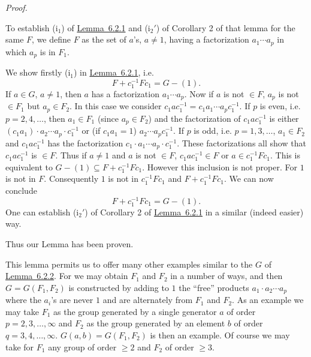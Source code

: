 \documentclass[b5paper,twoside]{article}
\newcommand{\lemref}[2]{\hyperref[#1]{\mbox{Lemma~#2}}}
\theoremstyle{mvnplain}
\renewenvironment{proof}[1][Proof]{%
  \par\addvspace{0.35\baselineskip}%
  \noindent\textit{#1.}\ \normalfont\ignorespaces
}{%
  \par\addvspace{0.35\baselineskip}%
}
\def\mathfrak#1{#1}%
\begin{document}
\begin{proof}
To establish (i$_1$) of \lemref{lem:6.2.1}{6.2.1} and (i$_2'$) of Corollary
2 of that lemma for the same $\mathfrak F$, we define $\mathfrak F$ as the
set of $a$'s, $a\ne1$, having a factorization $a_1\cdots a_p$ in which $a_p$
is in $\mathfrak F_1$.

We show firstly (i$_1$) in \lemref{lem:6.2.1}{6.2.1}, i.e.
\[
  \mathfrak F+c_1^{-1}\mathfrak F c_1=\mathfrak G-(1).
\]
If $a\in\mathfrak G$, $a\ne1$, then $a$ has a factorization
$a_1\cdots a_p$. Now if $a$ is not $\in\mathfrak F$, $a_p$ is not
$\in\mathfrak F_1$ but $a_p\in\mathfrak F_2$. In this case we consider
$c_1ac_1^{-1}=c_1a_1\cdots a_pc_1^{-1}$. If $p$ is even, i.e.
$p=2,4,\ldots$, then $a_1\in\mathfrak F_1$ (since
$a_p\in\mathfrak F_2$) and the factorization of $c_1ac_1^{-1}$ is either
$(c_1a_1)\cdot a_2\cdots a_p\cdot c_1^{-1}$ or (if $c_1a_1=1$)
$a_2\cdots a_p c_1^{-1}$. If $p$ is odd, i.e. $p=1,3,\ldots$,
$a_1\in\mathfrak F_2$ and $c_1ac_1^{-1}$ has the factorization
$c_1\cdot a_1\cdots a_p\cdot c_1^{-1}$. These factorizations all show that
$c_1ac_1^{-1}$ is $\in\mathfrak F$. Thus if $a\ne1$ and $a$ is not
$\in\mathfrak F$, $c_1ac_1^{-1}\in\mathfrak F$ or
$a\in c_1^{-1}\mathfrak F c_1$. This is equivalent to
$\mathfrak G-(1)\subseteq\mathfrak F+c_1^{-1}\mathfrak F c_1$. However this
inclusion is not proper. For $1$ is not in $\mathfrak F$. Consequently $1$
is not in $c_1^{-1}\mathfrak F c_1$ and
$\mathfrak F+c_1^{-1}\mathfrak F c_1$. We can now conclude
\[
  \mathfrak F+c_1^{-1}\mathfrak F c_1=\mathfrak G-(1).
\]
One can establish (i$_2'$) of Corollary 2 of \lemref{lem:6.2.1}{6.2.1} in
a similar (indeed easier) way.

Thus our Lemma has been proven.
\end{proof}

This lemma permits us to offer many other examples similar to the $\mathfrak G$
of \lemref{lem:6.2.2}{6.2.2}. For we may obtain $\mathfrak F_1$ and
$\mathfrak F_2$ in a number of ways, and then
$\mathfrak G=\mathfrak G(\mathfrak F_1,\mathfrak F_2)$ is constructed by
adding to $1$ the ``free'' products $a_1\cdot a_2\cdots a_p$ where the $a_i$'s
are never $1$ and are alternately from $\mathfrak F_1$ and $\mathfrak F_2$.
As an example we may take $\mathfrak F_1$ as the group generated by a single
generator $a$ of order $p=2,3,\ldots,\infty$ and $\mathfrak F_2$ as the group
generated by an element $b$ of order $q=3,4,\ldots,\infty$.
$\mathfrak G(a,b)=\mathfrak G(\mathfrak F_1,\mathfrak F_2)$ is then an
example. Of course we may take for $\mathfrak F_1$ any group of order $\geq2$
and $\mathfrak F_2$ of order $\geq3$.
\end{document}
